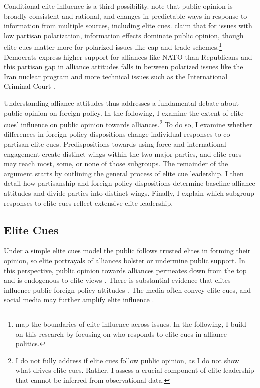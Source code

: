 \documentclass[12pt]{article}
\begin{document}
Conditional elite influence is a third possibility. 
\citet{PageShapiro1992} note that public opinion is broadly consistent and rational, and changes in predictable ways in response to information from multiple sources, including elite cues. 
\citet{GuisingerSaunders2017} claim that for issues with low partisan polarization, information effects dominate public opinion, though elite cues matter more for polarized issues like cap and trade schemes.\footnote{\citet{GuisingerSaunders2017} map the boundaries of elite influence across issues. In the following, I build on this research by focusing on who responds to elite cues in alliance politics.}
Democrats express higher support for alliances like NATO than Republicans \citep{PewNATO2020} and this partisan gap in alliance attitudes falls in between polarized issues like the Iran nuclear program and more technical issues such as the International Criminal Court \citet{GuisingerSaunders2017}. 


Understanding alliance attitudes thus addresses a fundamental debate about public opinion on foreign policy. 
In the following, I examine the extent of elite cues' influence on public opinion towards alliances.\footnote{I do not fully address if elite cues follow public opinion, as I do not show what drives elite cues. Rather, I assess a crucial component of elite leadership that cannot be inferred from observational data.}
To do so, I examine whether differences in foreign policy dispositions change individual responses to co-partisan elite cues.
Predispositions towards using force and international engagement create distinct wings within the two major parties, and elite cues may reach most, some, or none of those subgroups.
The remainder of the argument starts by outlining the general process of elite cue leadership.
I then detail how partisanship and foreign policy dispositions determine baseline alliance attitudes and divide parties into distinct wings.
Finally, I explain which subgroup responses to elite cues reflect extensive elite leadership. 


\subsection{Elite Cues} 


Under a simple elite cues model the public follows trusted elites in forming their opinion, so elite portrayals of alliances bolster or undermine public support.
In this perspective, public opinion towards alliances permeates down from the top and is endogenous to elite views \citep{Druckman2014}.
There is substantial evidence that elites influence public foreign policy attitudes \citep{BaumPotter2008}. 
The media often convey elite cues, and social media may further amplify elite influence \citep{BaumPotter2019}.   
\end{document}
